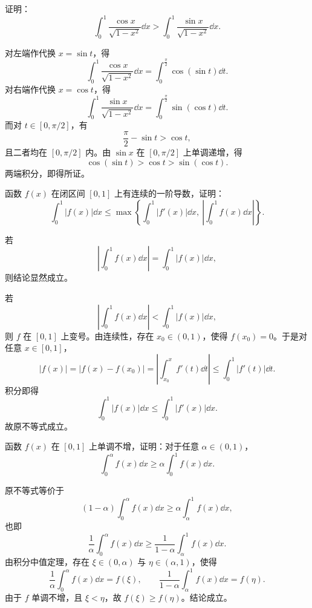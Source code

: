 \begin{problem}
	证明：
	\[
	\int_0^1\frac{\cos x}{\sqrt{1-x^2}}\dd x>
	\int_0^1\frac{\sin x}{\sqrt{1-x^2}}\dd x.
	\]
\end{problem}

\begin{solution}
	对左端作代换 $x=\sin t$，得
	\[
	\int_0^1\frac{\cos x}{\sqrt{1-x^2}}\dd x
	=\int_0^{\frac\pi2}\cos(\sin t)\dd t.
	\]
	对右端作代换 $x=\cos t$，得
	\[
	\int_0^1\frac{\sin x}{\sqrt{1-x^2}}\dd x
	=\int_0^{\frac\pi2}\sin(\cos t)\dd t.
	\]
	而对 $t\in[0,\pi/2]$，有
	\[
	\frac\pi2-\sin t>\cos t,
	\]
	且二者均在 $[0,\pi/2]$ 内。由 $\sin x$ 在 $[0,\pi/2]$ 上单调递增，得
	\[
	\cos(\sin t)>\cos t>\sin(\cos t).
	\]
	两端积分，即得所证。
\end{solution}

\begin{problem}
	函数 $f(x)$ 在闭区间 $[0,1]$ 上有连续的一阶导数，证明：
	\[
	\int_0^1 |f(x)|\dd x\leq
	\max\left\{\int_0^1 |f'(x)|\dd x,\ \left|\int_0^1 f(x)\dd x\right|\right\}.
	\]
\end{problem}

\begin{solution}
	若
	\[
	\left|\int_0^1 f(x)\dd x\right|=\int_0^1 |f(x)|\dd x,
	\]
	则结论显然成立。
	
	若
	\[
	\left|\int_0^1 f(x)\dd x\right|<\int_0^1 |f(x)|\dd x,
	\]
	则 $f$ 在 $[0,1]$ 上变号。由连续性，存在 $x_0\in(0,1)$，使得 $f(x_0)=0$。于是对任意 $x\in[0,1]$，
	\[
	|f(x)|=|f(x)-f(x_0)|
	=\left|\int_{x_0}^x f'(t)\dd t\right|
	\leq\int_0^1 |f'(t)|\dd t.
	\]
	积分即得
	\[
	\int_0^1 |f(x)|\dd x\leq \int_0^1 |f'(x)|\dd x.
	\]
	故原不等式成立。
\end{solution}

\begin{problem}
	函数 $f(x)$ 在 $[0,1]$ 上单调不增，证明：对于任意 $\alpha\in(0,1)$，
	\[
	\int_0^\alpha f(x)\dd x\geq \alpha\int_0^1 f(x)\dd x.
	\]
\end{problem}

\begin{solution}
	原不等式等价于
	\[
	(1-\alpha)\int_0^\alpha f(x)\dd x
	\geq
	\alpha\int_\alpha^1 f(x)\dd x,
	\]
	也即
	\[
	\frac1\alpha\int_0^\alpha f(x)\dd x
	\geq
	\frac1{1-\alpha}\int_\alpha^1 f(x)\dd x.
	\]
	由积分中值定理，存在 $\xi\in(0,\alpha)$ 与 $\eta\in(\alpha,1)$，使得
	\[
	\frac1\alpha\int_0^\alpha f(x)\dd x=f(\xi),\qquad
	\frac1{1-\alpha}\int_\alpha^1 f(x)\dd x=f(\eta).
	\]
	由于 $f$ 单调不增，且 $\xi<\eta$，故 $f(\xi)\geq f(\eta)$。结论成立。
\end{solution}


